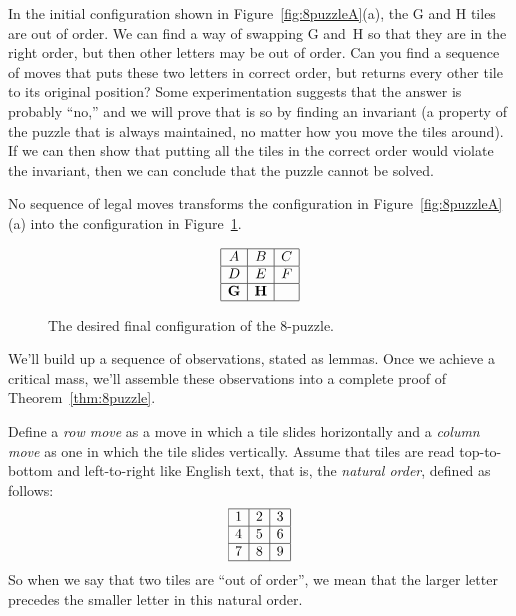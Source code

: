 In the initial configuration shown in Figure~\ref{fig:8puzzleA}(a),
the G and H tiles are out of order.  We can find a way of swapping G
and~H so that they are in the right order, but then other letters may
be out of order.  Can you find a sequence of moves that puts these two
letters in correct order, but returns every other tile to its original
position?  Some experimentation suggests that the answer is probably
``no,'' and we will prove that is so by finding an invariant (\ie a
property of the puzzle that is always maintained, no matter how you
move the tiles around).  If we can then show that putting all the
tiles in the correct order would violate the invariant, then we can
conclude that the puzzle cannot be solved.

\begin{theorem}\label{thm:8puzzle}
No sequence of legal moves transforms the configuration in
Figure~\ref{fig:8puzzleA}(a) into the configuration in
Figure~\ref{fig:8puzzlesolved}.
\end{theorem}

\begin{figure}[h]
\begin{equation*}
\begin{array}{|c|c|c|}
\hline
A & B & C \\ \hline
D & E & F \\ \hline
\mathbf{G} & \mathbf{H} &   \\ \hline
\end{array}
\end{equation*}

\caption{The desired final configuration of the 8-puzzle.}
\label{fig:8puzzlesolved}
\end{figure}

We'll build up a sequence of observations, stated as lemmas.  Once we
achieve a critical mass, we'll assemble these observations into a
complete proof of Theorem~\ref{thm:8puzzle}.

Define a \emph{row move} as a move in which a tile slides horizontally
and a \emph{column move} as one in which the tile slides vertically.
Assume that tiles are read top-to-bottom and left-to-right like
English text, that is, the \emph{natural order}, defined as follows:
\begin{equation*}
\begin{array}{|c|c|c|}
\hline
1 & 2 & 3 \\ \hline
4 & 5 & 6 \\ \hline
7 & 8 & 9 \\ \hline
\end{array}
\end{equation*}
So when we say that two tiles are ``out of order'', we mean that the
larger letter precedes the smaller letter in this natural order.

